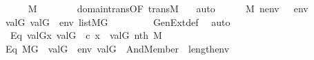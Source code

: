 \begin{isabellebody}
\ \ \ \ \isamarkupfalse%
\ {\isachardoublequoteopen}{\isasymtheta}{\isasymin}M{\isachardoublequoteclose}\isanewline
\ \ \ \ \ \ \isamarkupfalse%
\ domain{\isacharunderscore}{\kern0pt}trans{\isacharbrackleft}{\kern0pt}OF\ trans{\isacharunderscore}{\kern0pt}M\ {\isacartoucheopen}{\isasympi}{\isasymin}{\isacharunderscore}{\kern0pt}{\isacartoucheclose}{\isacharbrackright}{\kern0pt}\ \isamarkupfalse%
\ auto\isanewline
\ \ \ \ \isamarkupfalse%
\ {\isacartoucheopen}{\isasympi}{\isasymin}M{\isacartoucheclose}\ {\isacartoucheopen}nenv\ {\isasymin}\ {\isacharunderscore}{\kern0pt}{\isacartoucheclose}\ {\isacartoucheopen}env\ {\isacharequal}{\kern0pt}\ {\isacharunderscore}{\kern0pt}{\isacartoucheclose}\isanewline
\ \ \ \ \isamarkupfalse%
\ {\isachardoublequoteopen}{\isacharbrackleft}{\kern0pt}val{\isacharparenleft}{\kern0pt}G{\isacharcomma}{\kern0pt}{\isasymtheta}{\isacharparenright}{\kern0pt}{\isacharcomma}{\kern0pt}\ val{\isacharparenleft}{\kern0pt}G{\isacharcomma}{\kern0pt}{\isasympi}{\isacharparenright}{\kern0pt}{\isacharbrackright}{\kern0pt}\ {\isacharat}{\kern0pt}\ env\ {\isasymin}list{\isacharparenleft}{\kern0pt}M{\isacharbrackleft}{\kern0pt}G{\isacharbrackright}{\kern0pt}{\isacharparenright}{\kern0pt}{\isachardoublequoteclose}\ \isanewline
\ \ \ \ \ \ \isamarkupfalse%
\ GenExt{\isacharunderscore}{\kern0pt}def\ \isamarkupfalse%
\ auto\isanewline
\ \ \ \ \isamarkupfalse%
\ \ Eq{}\ {\isacartoucheopen}val{\isacharparenleft}{\kern0pt}G{\isacharcomma}{\kern0pt}{\isasymtheta}{\isacharparenright}{\kern0pt}{\isacharequal}{\kern0pt}x{\isacartoucheclose}\ {\isacartoucheopen}val{\isacharparenleft}{\kern0pt}G{\isacharcomma}{\kern0pt}{\isasympi}{\isacharparenright}{\kern0pt}\ {\isacharequal}{\kern0pt}\ c{\isacartoucheclose}\ {\isacartoucheopen}x\ {\isasymin}\ val{\isacharparenleft}{\kern0pt}G{\isacharcomma}{\kern0pt}{\isasympi}{\isacharparenright}{\kern0pt}{\isacartoucheclose}\ nth\ {\isacartoucheopen}{\isasymtheta}{\isasymin}M{\isacartoucheclose}\isanewline
\ \ \ \ \isamarkupfalse%
\ Eq{}{\isacharcolon}{\kern0pt}\ {\isachardoublequoteopen}M{\isacharbrackleft}{\kern0pt}G{\isacharbrackright}{\kern0pt}{\isacharcomma}{\kern0pt}\ \ {\isacharbrackleft}{\kern0pt}val{\isacharparenleft}{\kern0pt}G{\isacharcomma}{\kern0pt}{\isasymtheta}{\isacharparenright}{\kern0pt}{\isacharbrackright}{\kern0pt}\ {\isacharat}{\kern0pt}\ env\ {\isacharat}{\kern0pt}{\isacharbrackleft}{\kern0pt}val{\isacharparenleft}{\kern0pt}G{\isacharcomma}{\kern0pt}{\isasympi}{\isacharparenright}{\kern0pt}{\isacharbrackright}{\kern0pt}\ {\isasymTurnstile}\ And{\isacharparenleft}{\kern0pt}Member{\isacharparenleft}{\kern0pt}{}{\isacharcomma}{\kern0pt}{}\ {\isacharhash}{\kern0pt}{\isacharplus}{\kern0pt}\ length{\isacharparenleft}{\kern0pt}env{\isacharparenright}{\kern0pt}{\isacharparenright}{\kern0pt}{\isacharcomma}{\kern0pt}{\isasymphi}{\isacharparenright}{\kern0pt}{\isachardoublequoteclose}\ \isanewline

\end{isabellebody}
